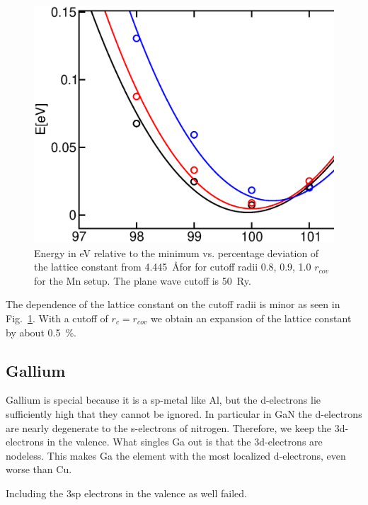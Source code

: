 \documentclass[11pt,a4paper]{report}
\begin{document}
\begin{figure}[!h]
\begin{center}
\includegraphics[width=0.5\linewidth,clip=true]{Figs/Mn_setuptest/mnoevsalat50ry.eps}
\end{center}
\caption{\label{fig:mno_evsalat50ry}Energy in eV relative to the
  minimum vs. percentage deviation of the lattice constant from
  4.445~\AA for for cutoff radii 0.8, 0.9, 1.0 $r_{cov}$ for the Mn
  setup. The plane wave cutoff is 50~Ry.}
\end{figure}
The dependence of the lattice constant on the cutoff radii is minor as
seen in Fig.~\ref{fig:mno_evsalat50ry}. With a cutoff of $r_c=r_{cov}$
we obtain an expansion of the lattice constant by about 0.5~\%.



\subsection{Gallium}
Gallium is special because it is a sp-metal like Al, but the
d-electrons lie sufficiently high that they cannot be ignored. In
particular in GaN the d-electrons are nearly degenerate to the
s-electrons of nitrogen.  Therefore, we keep the 3d-electrons in the
valence.  What singles Ga out is that the 3d-electrons are
nodeless. This makes Ga the element with the most localized
d-electrons, even worse than Cu.

Including the 3sp
electrons in the valence as well failed. 
\end{document}
